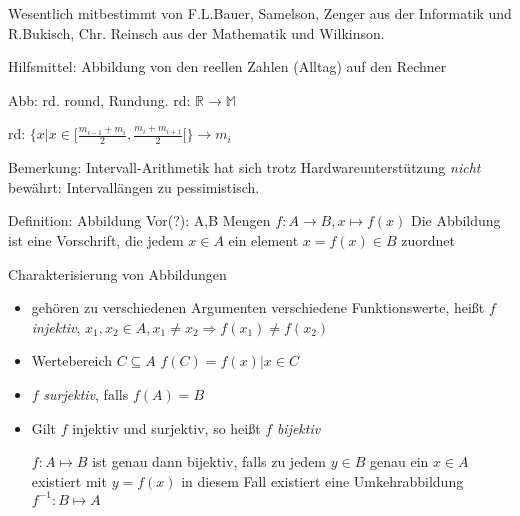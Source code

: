 Wesentlich mitbestimmt von F.L.Bauer, Samelson, Zenger aus der Informatik und R.Bukisch, Chr. Reinsch aus der Mathematik und Wilkinson.

Hilfsmittel: Abbildung von den reellen Zahlen (Alltag) auf den Rechner

Abb: rd. round, Rundung. rd: $\mathbb{R}\rightarrow\mathbb{M}$

rd: $\{x|x \in [\frac{m_{i-1}+m_i}{2},\frac{m_{i}+m_{i+1}}{2}[\} \rightarrow m_i$

Bemerkung: Intervall-Arithmetik hat sich trotz Hardwareunterstützung \emph{nicht} bewährt: Intervallängen zu pessimistisch.

Definition: Abbildung
Vor(?): A,B Mengen
$f: A \rightarrow B, x \mapsto f(x)$
Die Abbildung ist eine Vorschrift, die jedem $x \in A$ ein element $x=f(x) \in B$ zuordnet

Charakterisierung von Abbildungen
\begin{itemize}
 \item gehören zu verschiedenen Argumenten verschiedene Funktionswerte, heißt $f$ \emph{injektiv},
$x_1,x_2 \in A, x_1 \neq x_2 \Rightarrow f(x_1) \neq f(x_2)$
 \item Wertebereich $C \subseteq A$
$f(C) = {f(x)|x\in C}$
 \item $f$ \emph{surjektiv}, falls $f(A)=B$
 \item Gilt $f$ injektiv und surjektiv, so heißt $f$ \emph{bijektiv}

$f: A \mapsto B$ ist genau dann bijektiv, falls zu jedem $y \in B$ genau ein $x \in A $ existiert mit $y=f(x)$ in diesem Fall existiert eine Umkehrabbildung $f^{-1}: B \mapsto A$
\end{itemize}
